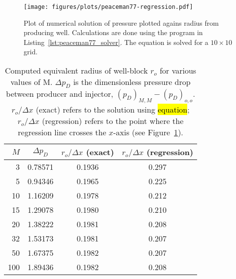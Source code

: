 \begin{figure}[htbp]
    \centering
    \texttt{[image: figures/plots/peaceman77-regression.pdf]}
    \caption{Plot of numerical solution of pressure plotted agains radius from producing well. Calculations are done using the program in Listing~\ref{lst:peaceman77_solver}. The equation is solved for a $10\times 10$ grid.}
    \label{fig:peaceman77_pressure_vs_radius}
\end{figure}

\begin{table}
    \centering
    \caption{Computed equivalent radius of well-block $r_o$ for various values of M. $\Delta p_D$ is the dimensionless pressure drop between producer and injector, $(p_D)_{M,M} - (p_D)_{o,o}$. $r_o/\Delta x$ (exact) refers to the solution using \hl{equation}; $r_o / \Delta x$ (regression) refers to the point where the regression line crosses the $x$-axis (see Figure~\ref{fig:peaceman77_pressure_vs_radius}).}
    \begin{tabular}{rccc}
        \toprule
        $M$ & $\Delta p_D$ & $r_o/\Delta x$ (exact) & $r_o / \Delta x$ (regression)\\
        \midrule
        3   & 0.78571 & 0.1936 & 0.297 \\
        5   & 0.94346 & 0.1965 & 0.225 \\
        10  & 1.16209 & 0.1978 & 0.212 \\
        15  & 1.29078 & 0.1980 & 0.210 \\
        20  & 1.38222 & 0.1981 & 0.208 \\
        32  & 1.53173 & 0.1981 & 0.207 \\
        50  & 1.67375 & 0.1982 & 0.207 \\
        100 & 1.89436 & 0.1982 & 0.208 \\
        \bottomrule
    \end{tabular}
    \label{tbl:label}
\end{table}

